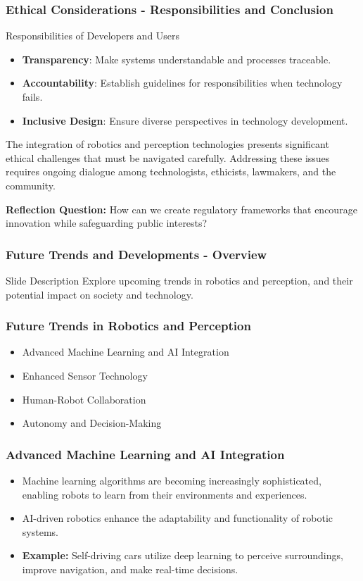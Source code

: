 \documentclass{beamer}
\begin{document}
\begin{frame}[fragile]
    \frametitle{Ethical Considerations - Responsibilities and Conclusion}
    \begin{block}{Responsibilities of Developers and Users}
        \begin{itemize}
            \item \textbf{Transparency}: Make systems understandable and processes traceable.
            \item \textbf{Accountability}: Establish guidelines for responsibilities when technology fails.
            \item \textbf{Inclusive Design}: Ensure diverse perspectives in technology development.
        \end{itemize}
    \end{block}

    The integration of robotics and perception technologies presents significant ethical challenges that must be navigated carefully. Addressing these issues requires ongoing dialogue among technologists, ethicists, lawmakers, and the community.

    \textbf{Reflection Question:} How can we create regulatory frameworks that encourage innovation while safeguarding public interests?
\end{frame}

\begin{frame}[fragile]
    \frametitle{Future Trends and Developments - Overview}
    \begin{block}{Slide Description}
        Explore upcoming trends in robotics and perception, and their potential impact on society and technology.
    \end{block}
\end{frame}

\begin{frame}[fragile]
    \frametitle{Future Trends in Robotics and Perception}
    \begin{itemize}
        \item Advanced Machine Learning and AI Integration
        \item Enhanced Sensor Technology
        \item Human-Robot Collaboration
        \item Autonomy and Decision-Making
    \end{itemize}
\end{frame}

\begin{frame}[fragile]
    \frametitle{Advanced Machine Learning and AI Integration}
    \begin{itemize}
        \item Machine learning algorithms are becoming increasingly sophisticated, enabling robots to learn from their environments and experiences.
        \item AI-driven robotics enhance the adaptability and functionality of robotic systems.
        \item \textbf{Example:} Self-driving cars utilize deep learning to perceive surroundings, improve navigation, and make real-time decisions.
    \end{itemize}
\end{frame}
\end{document}
